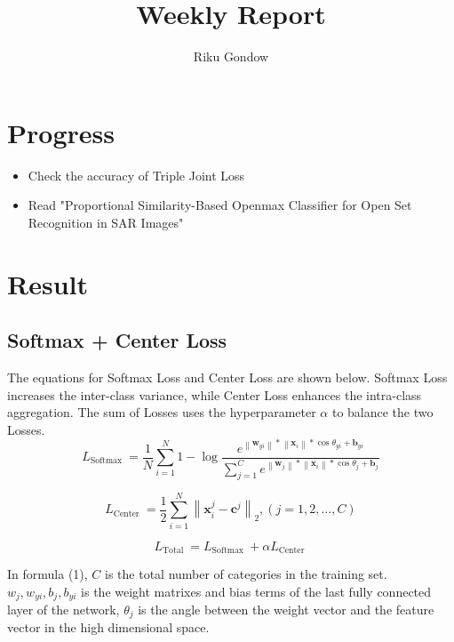 \documentclass[dvipdfmx]{article}
\begin{document}
\title{Weekly Report}
\author{Riku Gondow}
\maketitle
\section{Progress}
\begin{itemize}
    \item Check the accuracy of Triple Joint Loss\cite{TJL}
    \item Read "Proportional Similarity-Based Openmax Classifier for Open Set Recognition in SAR Images"\cite{PS}
\end{itemize}
\section{Result}
\subsection{Softmax + Center Loss}
The equations for Softmax Loss and Center Loss are shown below. Softmax Loss increases the inter-class variance, while Center Loss enhances the intra-class aggregation. The sum of Losses uses the hyperparameter $\alpha$ to balance the two Losses.
\begin{equation*}{L_{{\text{Softmax }}}} = \frac{1}{N}\sum\limits_{i = 1}^N 1 - \log \frac{{{e^{\left\| {{{\mathbf{w}}_{yi}}} \right\|*\left\| {{{\mathbf{x}}_i}} \right\|*\cos {\theta _{yi}} + {{\mathbf{b}}_{yi}}}}}}{{\sum\limits_{j = 1}^C {{e^{\left\| {{{\mathbf{w}}_j}} \right\|*\left\| {{{\mathbf{x}}_i}} \right\|*\cos {\theta _j} + {{\mathbf{b}}_j}}}} }}\tag{1}\end{equation*}

\begin{equation*}{L_{{\text{Center }}}} = \frac{1}{2}\sum\limits_{i = 1}^N {{{\left\| {{\mathbf{x}}_i^j - {{\mathbf{c}}^j}} \right\|}_2}} ,(j = 1,2, \ldots ,C)\tag{2}\end{equation*}

\begin{equation*}{L_{{\text{Total }}}} = {L_{{\text{Softmax }}}} + \alpha {L_{{\text{Center }}}}\end{equation*}

In formula (1), $C$ is the total number of categories in the training set. $w_j, w_{yi}, b_j, b_{yi}$ is the weight matrixes and bias terms of the last fully connected layer of the network, $\theta_j$ is the angle between the weight vector and the feature vector in the high dimensional space.
\end{document}

